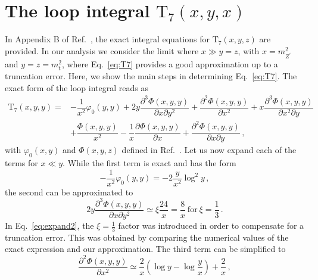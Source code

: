 \documentclass[10pt]{report}
\newcommand{\ro}[1]{\textrm{#1}}
\renewcommand{\(}{\left(}
\renewcommand{\)}{\right)}
\renewcommand{\[}{\left[}
\renewcommand{\]}{\right]}
\newcommand{\del}{\partial}
\begin{document}












\section{The loop integral $\ro{T}_7(x,y,x)$}
\label{app:T7}

In Appendix B of Ref.~\cite{Feng:2009gn}, the exact integral equations for $\ro{T}_7\(x,y,z\)$ are provided. 
In our analysis we consider the limit where $x \gg y = z$, with $x = m_{Z^\prime}^2$ and $y = z = m_t^2$, 
where Eq.~\eqref{eq:T7} provides a good approximation up to a truncation error. Here, we show the main steps 
in determining Eq.~\eqref{eq:T7}. The exact form of the loop integral reads as
\begin{equation}
\begin{aligned}
    \ro{T}_7\(x,y,y\) =& -\dfrac{1}{x^2} \varphi_0\(y,y\) + 2 y \dfrac{\del^3 \Phi(x,y,y)}{\del x \del y^2} + \dfrac{\del^2 \Phi(x,y,y)}{\del x^2} + x \dfrac{\del^3 \Phi(x,y,y)}{\del x^2 \del y} \\
    & + \dfrac{\Phi(x,y,y)}{x^2}
    -\dfrac{1}{x} \dfrac{\del \Phi(x,y,y)}{\del x}
    + \dfrac{\del^2 \Phi(x,y,y)}{\del x \del y} \,,
\end{aligned}    
\label{eq:T7-Integrals}
\end{equation}
with $\varphi_0 (x,y)$ and $\Phi(x,y,z)$ defined in Ref.~\cite{Feng:2009gn}. Let us now expand 
each of the terms for $x \ll y$. While the first term is exact and has the form
\begin{equation}
    -\dfrac{1}{x^2} \varphi_0\(y,y\) = -2 \dfrac{y}{x^2} \log^2 y \,,
    \label{eq:expand1}
\end{equation}
the second can be approximated to
\begin{equation}
    2 y \dfrac{\del^3 \Phi(x,y,y)}{\del x \del y^2} \simeq \xi \dfrac{24}{x} = \dfrac{8}{x} ~\textrm{for}~ \xi = \dfrac{1}{3}\,.
    \label{eq:expand2}
\end{equation}
In Eq.~\eqref{eq:expand2}, the $\xi = \tfrac{1}{3}$ factor was introduced in order to compensate for a truncation error. This was obtained by comparing the numerical values of the exact expression and our approximation. The third term can be simplified to
\begin{equation}
    \dfrac{\del^2 \Phi(x,y,y)}{\del x^2} \simeq \dfrac{2}{x} \( \log y - \log \dfrac{y}{x} \) + \dfrac{2}{x} \,,
    \label{eq:expand3}
\end{equation}
\end{document}
